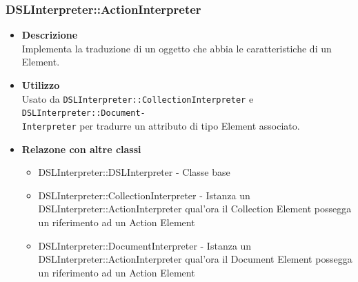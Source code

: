 \subsubsection{DSLInterpreter::ActionInterpreter}
\begin{itemize}
\item \textbf{Descrizione} \hfill \\
Implementa la traduzione di un oggetto che abbia le caratteristiche di un  Element.
\item \textbf{Utilizzo} \hfill \\
Usato da \texttt{DSLInterpreter::CollectionInterpreter} e \texttt{DSLInterpreter::Document-}\\\texttt{Interpreter} per tradurre un attributo di tipo  Element associato.
\item \textbf{Relazone con altre classi}
\begin{itemize}
\item DSLInterpreter::DSLInterpreter - Classe base
\item DSLInterpreter::CollectionInterpreter - Istanza un DSLInterpreter::ActionInterpreter qual'ora il Collection Element possegga un riferimento ad un Action Element
\item DSLInterpreter::DocumentInterpreter - Istanza un DSLInterpreter::ActionInterpreter qual'ora il Document Element possegga un riferimento ad un Action Element
\end{itemize}
\end{itemize}

